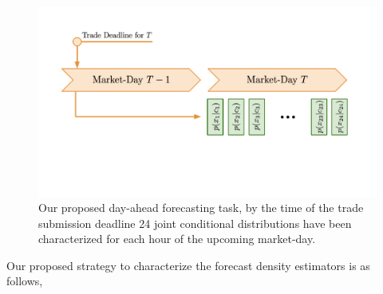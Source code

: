 \begin{figure}[htbp]
    \caption[Proposed forecasting methodology in relation to the day-ahead forecasting timeline]{
        Our proposed day-ahead forecasting task, by the time of the trade submission deadline 24 joint conditional
        distributions have been characterized for each hour of the upcoming market-day.
    }
    \begin{center}
        \setlength{\fboxsep}{0pt}%
        \setlength{\fboxrule}{1pt}%
            \includegraphics[width=120mm]{figs/da_fc_task.pdf}
    \end{center}
    \label{fig:da_fc_task}
\end{figure}

Our proposed strategy to characterize the forecast density estimators is as follows,

